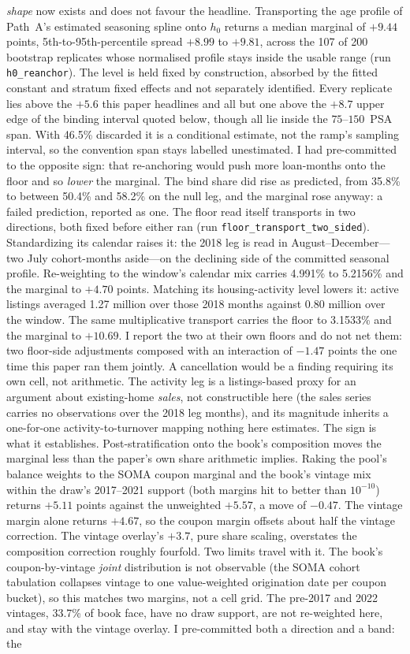 \documentclass[12pt]{article}
\begin{document}
\emph{shape} now exists and does not favour the headline. Transporting the age profile of Path~A's estimated seasoning spline onto $h_0$ returns a median marginal of $+9.44$ points, 5th-to-95th-percentile spread $+8.99$ to $+9.81$, across the 107 of 200 bootstrap replicates whose normalised profile stays inside the usable range (run \texttt{h0\_reanchor}). The level is held fixed by construction, absorbed by the fitted constant and stratum fixed effects and not separately identified. Every replicate lies above the $+5.6$ this paper headlines and all but one above the $+8.7$ upper edge of the binding interval quoted below, though all lie inside the $75$--$150$~PSA span. With 46.5\% discarded it is a conditional estimate, not the ramp's sampling interval, so the convention span stays labelled unestimated. I had pre-committed to the opposite sign: that re-anchoring would push more loan-months onto the floor and so \emph{lower} the marginal. The bind share did rise as predicted, from 35.8\% to between 50.4\% and 58.2\% on the null leg, and the marginal rose anyway: a failed prediction, reported as one. The floor read itself transports in two directions, both fixed before either ran (run \texttt{floor\_transport\_two\_sided}). Standardizing its calendar raises it: the 2018 leg is read in August--December---two July cohort-months aside---on the declining side of the committed seasonal profile. Re-weighting to the window's calendar mix carries 4.991\% to 5.2156\% and the marginal to $+4.70$ points. Matching its housing-activity level lowers it: active listings averaged 1.27 million over those 2018 months against 0.80 million over the window. The same multiplicative transport carries the floor to 3.1533\% and the marginal to $+10.69$. I report the two at their own floors and do not net them: two floor-side adjustments composed with an interaction of $-1.47$ points the one time this paper ran them jointly. A cancellation would be a finding requiring its own cell, not arithmetic. The activity leg is a listings-based proxy for an argument about existing-home \emph{sales}, not constructible here (the sales series carries no observations over the 2018 leg months), and its magnitude inherits a one-for-one activity-to-turnover mapping nothing here estimates. The sign is what it establishes. Post-stratification onto the book's composition moves the marginal less than the paper's own share arithmetic implies. Raking the pool's balance weights to the SOMA coupon marginal and the book's vintage mix within the draw's 2017--2021 support (both margins hit to better than $10^{-10}$) returns $+5.11$ points against the unweighted $+5.57$, a move of $-0.47$. The vintage margin alone returns $+4.67$, so the coupon margin offsets about half the vintage correction. The vintage overlay's $+3.7$, pure share scaling, overstates the composition correction roughly fourfold. Two limits travel with it. The book's coupon-by-vintage \emph{joint} distribution is not observable (the SOMA cohort tabulation collapses vintage to one value-weighted origination date per coupon bucket), so this matches two margins, not a cell grid. The pre-2017 and 2022 vintages, 33.7\% of book face, have no draw support, are not re-weighted here, and stay with the vintage overlay. I pre-committed both a direction and a band: the 
\end{document}
